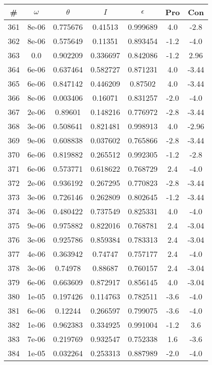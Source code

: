 \begin{table}
\begin{tabular}{c|c|c|c|c|c|c}
\# & $\omega$ & $\theta$ & $I$ & $\epsilon$ & Pro & Con\\
\hline
361 & 8e-06 & 0.775676 & 0.41513 & 0.999689 & 4.0 & -2.8\\
362 & 8e-06 & 0.575649 & 0.11351 & 0.893454 & -1.2 & -4.0\\
363 & 0.0 & 0.902209 & 0.336697 & 0.842086 & -1.2 & 2.96\\
364 & 6e-06 & 0.637464 & 0.582727 & 0.871231 & 4.0 & -3.44\\
365 & 6e-06 & 0.847142 & 0.446209 & 0.87502 & 4.0 & -3.44\\
366 & 8e-06 & 0.003406 & 0.16071 & 0.831257 & -2.0 & -4.0\\
367 & 2e-06 & 0.89601 & 0.148216 & 0.776972 & -2.8 & -3.44\\
368 & 3e-06 & 0.508641 & 0.821481 & 0.998913 & 4.0 & -2.96\\
369 & 9e-06 & 0.608838 & 0.037602 & 0.765866 & -2.8 & -3.44\\
370 & 6e-06 & 0.819882 & 0.265512 & 0.992305 & -1.2 & -2.8\\
371 & 6e-06 & 0.573771 & 0.618622 & 0.768729 & 2.4 & -4.0\\
372 & 2e-06 & 0.936192 & 0.267295 & 0.770823 & -2.8 & -3.44\\
373 & 3e-06 & 0.726146 & 0.262809 & 0.802645 & -1.2 & -3.44\\
374 & 3e-06 & 0.480422 & 0.737549 & 0.825331 & 4.0 & -4.0\\
375 & 9e-06 & 0.975882 & 0.822016 & 0.768781 & 2.4 & -3.04\\
376 & 3e-06 & 0.925786 & 0.859384 & 0.783313 & 2.4 & -3.04\\
377 & 4e-06 & 0.363942 & 0.74747 & 0.757177 & 2.4 & -4.0\\
378 & 3e-06 & 0.74978 & 0.88687 & 0.760157 & 2.4 & -3.04\\
379 & 6e-06 & 0.663609 & 0.872917 & 0.856145 & 4.0 & -3.04\\
380 & 1e-05 & 0.197426 & 0.114763 & 0.782511 & -3.6 & -4.0\\
381 & 6e-06 & 0.12244 & 0.266597 & 0.799075 & -3.6 & -4.0\\
382 & 1e-06 & 0.962383 & 0.334925 & 0.991004 & -1.2 & 3.6\\
383 & 7e-06 & 0.219769 & 0.932547 & 0.752338 & 1.6 & -3.6\\
384 & 1e-05 & 0.032264 & 0.253313 & 0.887989 & -2.0 & -4.0\\

\end{tabular}
\end{table}
